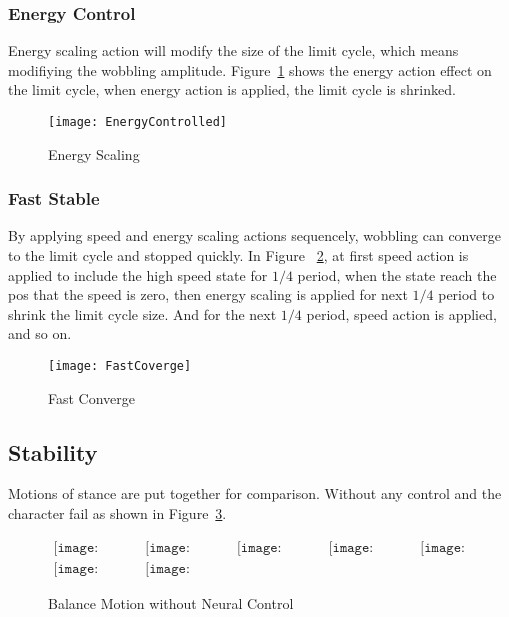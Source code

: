 \subsubsection*{Energy Control}
Energy scaling action will modify the size of the limit cycle, which means modifiying the wobbling amplitude.
Figure~\ref{fig:energyscaling} shows the energy action effect on the limit cycle, when energy action is applied, the limit cycle is shrinked.


\begin{figure}[!htbp]
  \begin{center}
      \texttt{[image: EnergyControlled]}
    \caption{Energy Scaling}
    \label{fig:energyscaling}
\end{center}
\end{figure}





\subsubsection*{Fast Stable}
By applying speed and energy scaling actions sequencely, wobbling can converge to the limit cycle and stopped quickly.
In Figure ~\ref{fig:fastconverg}, at first speed action is applied to include the high speed state for $1/4$ period, when the state reach the pos that the speed is zero, then energy scaling is applied for next $1/4$ period to shrink the limit cycle size.
And for the next $1/4$ period, speed action is applied, and so on.

\begin{figure}[!htbp]
  \begin{center}
      \texttt{[image: FastCoverge]}
    \caption{Fast Converge}
    \label{fig:fastconverg}
\end{center}
\end{figure}

\subsection{Stability}
Motions of stance are put together for comparison.
Without any control and the character fail as shown in Figure~\ref{fig:stancefall}.
\begin{figure}[h]
\begin{center}$
\begin{array}{ccccc}
\texttt{[image: stanceFall/0001.eps]}&
\texttt{[image: stanceFall/0021.eps]}&
\texttt{[image: stanceFall/0041.eps]}&
\texttt{[image: stanceFall/0061.eps]}&
\texttt{[image: stanceFall/0081.eps]}
\\
\texttt{[image: stanceFall/0101.eps]}&
\texttt{[image: stanceFall/0121.eps]}
\end{array}$
\end{center}
\caption{Balance Motion without Neural Control}
    \label{fig:stancefall}
\end{figure}

